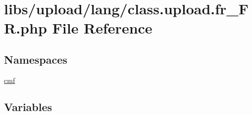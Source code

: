 \hypertarget{class_8upload_8fr___f_r_8php}{}\section{libs/upload/lang/class.upload.\+fr\+\_\+\+F\+R.\+php File Reference}
\label{class_8upload_8fr___f_r_8php}
\subsection*{Namespaces}
\begin{DoxyCompactItemize}
\item 
 \hyperlink{namespacecmf}{cmf}
\end{DoxyCompactItemize}
\subsection*{Variables}
